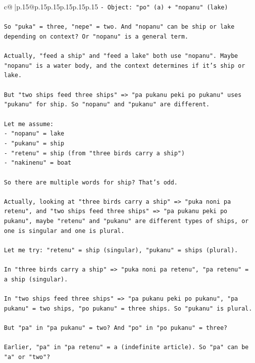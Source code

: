 \documentclass{article}
\begin{document}
{\begin{supertabular}{c@{$\;$}|p{.15\linewidth}@{}p{.15\linewidth}p{.15\linewidth}p{.15\linewidth}p{.15\linewidth}p{.15\linewidth}}
{{{\texttt{{-} Object: "po" (a) + "nopanu" (lake)} \\
\\ 
\texttt{So "puka" = three, "nepe" = two. And "nopanu" can be ship or lake depending on context? Or "nopanu" is a general term.} \\
\\ 
\texttt{Actually, "feed a ship" and "feed a lake" both use "nopanu". Maybe "nopanu" is a water body, and the context determines if it's ship or lake.} \\
\\ 
\texttt{But "two ships feed three ships" => "pa pukanu peki po pukanu" uses "pukanu" for ship. So "nopanu" and "pukanu" are different.} \\
\\ 
\texttt{Let me assume:} \\
\texttt{{-} "nopanu" = lake} \\
\texttt{{-} "pukanu" = ship} \\
\texttt{{-} "retenu" = ship (from "three birds carry a ship")} \\
\texttt{{-} "nakinenu" = boat} \\
\\ 
\texttt{So there are multiple words for ship? That's odd.} \\
\\ 
\texttt{Actually, looking at "three birds carry a ship" => "puka noni pa retenu", and "two ships feed three ships" => "pa pukanu peki po pukanu", maybe "retenu" and "pukanu" are different types of ships, or one is singular and one is plural.} \\
\\ 
\texttt{Let me try: "retenu" = ship (singular), "pukanu" = ships (plural).} \\
\\ 
\texttt{In "three birds carry a ship" => "puka noni pa retenu", "pa retenu" = a ship (singular).} \\
\\ 
\texttt{In "two ships feed three ships" => "pa pukanu peki po pukanu", "pa pukanu" = two ships, "po pukanu" = three ships. So "pukanu" is plural.} \\
\\ 
\texttt{But "pa" in "pa pukanu" = two? And "po" in "po pukanu" = three?} \\
\\ 
\texttt{Earlier, "pa" in "pa retenu" = a (indefinite article). So "pa" can be "a" or "two"?} \\
}}}
\end{supertabular}}
\end{document}
